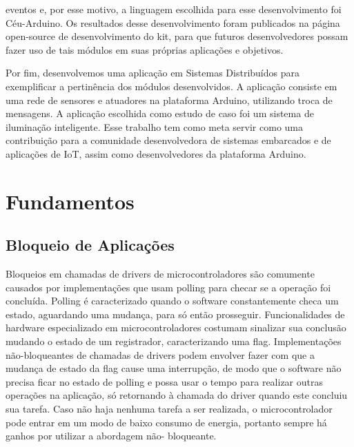 \documentclass[11pt]{article}
\begin{document}
eventos e, por esse motivo, a linguagem escolhida para esse desenvolvimento foi Céu-Arduino. Os
resultados desse desenvolvimento foram publicados na página open-source de desenvolvimento do
kit, para que futuros desenvolvedores possam fazer uso de tais módulos em suas próprias aplicações
e objetivos.
\par Por fim, desenvolvemos uma aplicação em Sistemas Distribuídos para exemplificar a pertinência
dos módulos desenvolvidos. A aplicação consiste em uma rede de sensores e atuadores na
plataforma Arduino, utilizando troca de mensagens. A aplicação escolhida como estudo de caso foi um sistema de iluminação inteligente. Esse trabalho tem como meta servir como uma contribuição
para a comunidade desenvolvedora de sistemas embarcados e de aplicações de IoT, assim como
desenvolvedores da plataforma Arduino. \cite{wortmann2015} \cite{chui2010} \cite{edwards1997} \cite{githubceu} \cite{atmegadatasheet}

\section{Fundamentos}

\subsection{Bloqueio de Aplicações}

\tab Bloqueios em chamadas de drivers de microcontroladores são comumente causados por implementações que usam polling para checar se a operação foi concluída. Polling é caracterizado
quando o software constantemente checa um estado, aguardando uma mudança, para só então
prosseguir. Funcionalidades de hardware especializado em microcontroladores costumam sinalizar sua
conclusão mudando o estado de um registrador, caracterizando uma flag. Implementações não-bloqueantes de chamadas de drivers podem envolver fazer com que a mudança de estado da flag cause
uma interrupção, de modo que o software não precisa ficar no estado de polling e possa usar o tempo
para realizar outras operações na aplicação, só retornando à chamada do driver quando este concluiu
sua tarefa. Caso não haja nenhuma tarefa a ser realizada, o microcontrolador pode entrar em um
modo de baixo consumo de energia, portanto sempre há ganhos por utilizar a abordagem não-
bloqueante.
\end{document}
